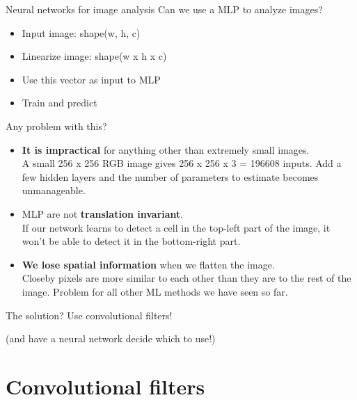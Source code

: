 \documentclass[9pt, aspectratio=169]{beamer}
\begin{document}
\begin{frame}
    {Neural networks for image analysis}
    Can we use a MLP to analyze images?

    \begin{itemize}
        \item Input image: shape(w, h, c)
        \item Linearize image: shape(w x h x c)
        \item Use this vector as input to MLP
        \item Train and predict
    \end{itemize}

    Any problem with this?
    \pause

    \begin{itemize}[<+->]
        \item \textbf{It is impractical} for anything other than extremely small images.\\
              A small 256 x 256 RGB image gives 256 x 256 x 3 = 196608 inputs. Add a few hidden layers and the number of parameters to estimate becomes unmanageable.
        \item MLP are not \textbf{translation invariant}.\\
              If our network learns to detect a cell in the top-left part of the image, it won't be able to detect it in the bottom-right part.
        \item \textbf{We lose spatial information} when we flatten the image.\\
              Closeby pixels are more similar to each other than they are to the rest of the image. Problem for all other ML methods we have seen so far.
    \end{itemize}
\end{frame}

\begin{frame}
    {The solution?}
    \LARGE
    \centering
    Use convolutional filters!

    \normalsize
    (and have a neural network decide which to use!)
\end{frame}

\section{Convolutional filters}
\end{document}
